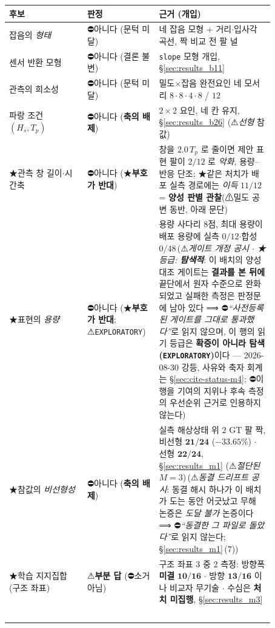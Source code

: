 \documentclass[11pt]{report}
\numberwithin{equation}{chapter}
\numberwithin{figure}{chapter}
\numberwithin{table}{chapter}
\newcommand{\MOneDrift}{\,(⚠\emph{동결 드리프트 공시}: 동결 해시 하나가 이 배치가 도는
동안 어긋났고 무해 논증은 \emph{도달 불가} 논증이다 ⟹ ⛔\emph{``동결한 그 파일로
돌았다''}로 읽지 않는다; \S\ref{sec:results_m1}\,(7))}
\newcommand{\MFourGate}{\,(⚠\emph{게이트 개정 공시 $\cdot$ ★등급: \textbf{탐색적}}:
이 배치의 양성대조 게이트는 \textbf{결과를 본 뒤에} 끝단에서 원자 수준으로 완화되었고
실패한 측정은 판정문에 남아 있다 ⟹ ⛔\emph{``사전등록된 게이트를 그대로 통과했다''}로
읽지 않으며, 이 행의 읽기 등급은 \textbf{확증이 아니라 탐색(\texttt{EXPLORATORY})}이다
--- 2026-08-30 강등, 사유와 축자 회계는 \S\ref{sec:cite-status-m4};
⛔이 행을 기여의 지위나 후속 측정의 우선순위 근거로 인용하지 않는다)}
\begin{document}
\begin{center}
\small
\begin{tabular}{p{0.27\linewidth}p{0.20\linewidth}p{0.40\linewidth}}
\toprule
후보 & 판정 & 근거 (개입) \\
\midrule
잡음의 \emph{형태} & ⛔아니다 (문턱 미달) & 네 잡음 모형 + 거리$\cdot$입사각 곡선, 짝 비교 전 팔 널 \\
센서 반환 모형 & ⛔아니다 (결론 불변) & \texttt{slope} 모형 개입, \S\ref{sec:results_b11} \\
관측의 희소성 & ⛔아니다 (문턱 미달) & 밀도$\times$잡음 완전요인 네 모서리 $8\cdot8\cdot4\cdot8$ / $12$ \\
파랑 조건 $(H_s, T_p)$ & ⛔아니다 (\textbf{축의 배제}) & $2\times2$ 요인, 네 칸 유지, \S\ref{sec:results_b26} (⚠\emph{선형} 참값) \\
★관측 창 길이$\cdot$시간축 & ⛔아니다 (★\textbf{부호가 반대}) & 창을 $2.0\,T_p$ 로 줄이면 제안 표현 팔이 $2/12$ 로 \emph{악화}, 용량--반응 단조; ★같은 처치가 배포 실측 경로에는 \emph{이득} $11/12$ = \textbf{양성 판별 관찰}(⚠밀도 공변 동반, 아래 문단) \\
★표현의 \emph{용량} & ⛔아니다 (★\textbf{부호가 반대}; ⚠\texttt{EXPLORATORY}) & 용량 사다리 $8$점, 최대 용량이 배포 용량에 실측 $0/12$$\cdot$합성 $0/48$\MFourGate{} \\
★참값의 \emph{비선형성} & ⛔아니다 (\textbf{축의 배제}) & 실측 해상상태 위 $2$ GT 팔 짝, 비선형 $\mathbf{21/24}$ ($-33.65\%$) $\cdot$ 선형 $\mathbf{22/24}$, \S\ref{sec:results_m1} (⚠\emph{절단된} $M{=}3$)\MOneDrift{} \\
★학습 지지집합 (구조 좌표) & ⚠\textbf{부분 답} (⛔소거 아님) & 구조 좌표 $3$ 중 $2$ 측정: 방향폭 \textbf{미결} $\mathbf{10/16}$ $\cdot$ 방향 $\mathbf{13/16}$ 이나 비교자 무기술 $\cdot$ 수심은 \textbf{처치 미집행}, \S\ref{sec:results_m3} \\
$$
\end{tabular}
\end{center}
\end{document}

